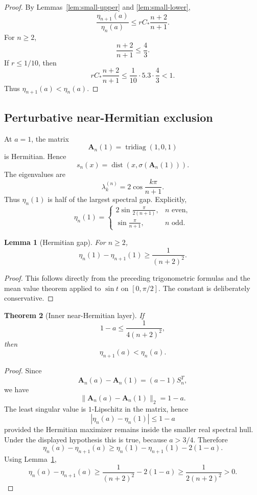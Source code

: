 \documentclass[11pt]{article}
\numberwithin{equation}{section}
\newtheorem{theorem}{Theorem}[section]
\newtheorem{lemma}[theorem]{Lemma}
\begin{document}
\begin{proof}
By Lemmas~\ref{lem:small-upper} and \ref{lem:small-lower},
\[
\frac{\eta_{n+1}(a)}{\eta_n(a)}
\le
rC_*\frac{n+2}{n+1}.
\]
For \(n\ge2\),
\[
\frac{n+2}{n+1}\le\frac43.
\]
If \(r\le1/10\), then
\[
rC_*\frac{n+2}{n+1}
\le
\frac1{10}\cdot5.3\cdot\frac43<1.
\]
Thus \(\eta_{n+1}(a)<\eta_n(a)\).
\end{proof}

\subsection{Perturbative near-Hermitian exclusion}

At \(a=1\), the matrix
\[
\mathbf A_n(1)=\operatorname{tridiag}(1,0,1)
\]
is Hermitian. Hence
\[
s_n(x)=\operatorname{dist}(x,\sigma(\mathbf A_n(1))).
\]
The eigenvalues are
\[
\lambda_k^{(n)}=2\cos\frac{k\pi}{n+1}.
\]
Thus \(\eta_n(1)\) is half of the largest spectral gap. Explicitly,
\[
\eta_n(1)=
\begin{cases}
2\sin\frac{\pi}{2(n+1)},&n\text{ even},\\[1mm]
\sin\frac{\pi}{n+1},&n\text{ odd}.
\end{cases}
\]

\begin{lemma}[Hermitian gap]
\label{lem:hermitian-gap}
For \(n\ge2\),
\[
\eta_n(1)-\eta_{n+1}(1)
\ge
\frac{1}{(n+2)^2}.
\]
\end{lemma}

\begin{proof}
This follows directly from the preceding trigonometric formulas and the mean value
theorem applied to \(\sin t\) on \([0,\pi/2]\). The constant is deliberately conservative.
\end{proof}

\begin{theorem}[Inner near-Hermitian layer]
\label{thm:inner-layer}
If
\[
1-a\le\frac{1}{4(n+2)^2},
\]
then
\[
\eta_{n+1}(a)<\eta_n(a).
\]
\end{theorem}

\begin{proof}
Since
\[
\mathbf A_n(a)-\mathbf A_n(1)=(a-1)S_n^T,
\]
we have
\[
\|\mathbf A_n(a)-\mathbf A_n(1)\|_2=1-a.
\]
The least singular value is \(1\)-Lipschitz in the matrix, hence
\[
|\eta_n(a)-\eta_n(1)|\le1-a
\]
provided the Hermitian maximizer remains inside the smaller real spectral hull.
Under the displayed hypothesis this is true, because \(a>3/4\). Therefore
\[
\eta_n(a)-\eta_{n+1}(a)
\ge
\eta_n(1)-\eta_{n+1}(1)-2(1-a).
\]
Using Lemma~\ref{lem:hermitian-gap},
\[
\eta_n(a)-\eta_{n+1}(a)
\ge
\frac{1}{(n+2)^2}-2(1-a)
\ge
\frac{1}{2(n+2)^2}>0.
\]
\end{proof}
\end{document}
